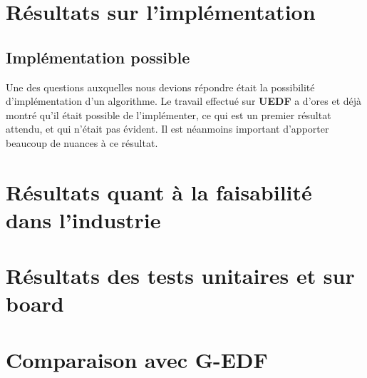 
\section{Résultats sur l'implémentation}
\label{resultats}
	\subsection{Implémentation possible}
	
	Une des questions auxquelles nous devions répondre était la possibilité d'implémentation d'un algorithme.
	Le travail effectué sur \textbf{UEDF} a d'ores et déjà montré qu'il était possible de l'implémenter, ce qui est un premier résultat attendu, et qui n'était pas évident.
	Il est néanmoins important d'apporter beaucoup de nuances à ce résultat.\newline
	
	
	

\section{Résultats quant à la faisabilité dans l'industrie}

	

\section{Résultats des tests unitaires et sur board}

	

\section{Comparaison avec G-EDF}

	